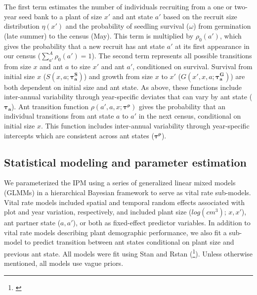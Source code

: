\documentclass[11pt]{article}
\newcommand{\tom}[2]{{\color{red}{#1}}\footnote{\textit{\color{red}{#2}}}}
\begin{document}
\noindent The first term estimates the number of individuals recruiting from a one or two-year seed bank to a plant of size $x'$ and ant state $a'$ based on the recruit size distribution $\eta(x')$ and the probability of seedling survival ($\omega$) from germination (late summer) to the census (May).
This term is multiplied by $\rho_{0}(a')$, which gives the probability that a new recruit has ant state $a'$ at its first appearance in our census ($\sum_{a'}^{A}\rho_{0}(a')=1$). 
The second term represents all possible transitions from size $x$ and ant $a$ to size $x'$ and ant $a'$, conditioned on survival. 
Survival from initial size $x$ ($S(x,a;\pmb{\tau^S_{a}})$) and growth from size $x$ to $x'$ ($G(x',x,a;\pmb{\tau^G_{a}})$) are both dependent on initial size and ant state. 
As above, these functions include inter-annual variability through year-specific deviates that can vary by ant state ($\pmb{\tau_{a}}$). 
Ant transition function $\rho(a',a,x;\pmb{\tau^{\rho}})$ gives the probability that an individual transitions from ant state $a$ to $a'$ in the next census, conditional on initial size $x$. 
This function includes inter-annual variability through year-specific intercepts which are consistent across ant states ($\pmb{\tau^\rho}$).

\subsection*{Statistical modeling and parameter estimation}
We parameterized the IPM using a series of generalized linear mixed models (GLMMs) in a hierarchical Bayesian framework to serve as vital rate sub-models. 
Vital rate models included spatial and temporal random effects associated with plot and year variation, respectively, and included plant size ($log(cm^3)$; $x,x'$), ant partner state ($a,a'$), or both as fixed-effect predictor variables. 
In addition to vital rate models describing plant demographic performance, we also fit a sub-model to predict transition between ant states conditional on plant size and previous ant state. 
All models were fit using Stan and Rstan (\tom{}{Cite Stan and RStan.}). 
Unless otherwise mentioned, all models use vague priors. 
\end{document}
